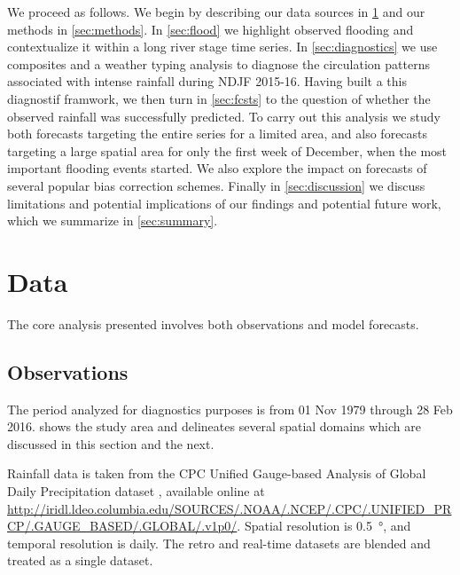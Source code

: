 \documentclass[twocol]{ametsoc}
\begin{document}
We proceed as follows.
We begin by describing our data sources in \cref{sec:data} and our methods in \cref{sec:methods}.
In \cref{sec:flood} we highlight observed flooding and contextualize it within a long river stage time series.
In \cref{sec:diagnostics} we use composites and a weather typing analysis to diagnose the circulation patterns associated with intense rainfall during NDJF 2015-16.
Having built a this diagnostif framwork, we then turn in \cref{sec:fcsts} to the question of whether the observed rainfall was successfully predicted.
To carry out this analysis we study both forecasts targeting the entire series for a limited area, and also forecasts targeting a large spatial area for only the first week of December, when the most important flooding events started.
We also explore the impact on forecasts of several popular bias correction schemes.
Finally in \cref{sec:discussion} we discuss limitations and potential implications of our findings and potential future work, which we summarize in \cref{sec:summary}.


\section{Data} \label{sec:data}

The core analysis presented involves both observations and model forecasts.

\subsection{Observations}

The period analyzed for diagnostics purposes is from 01 Nov 1979 through 28 Feb 2016.
 shows the study area and delineates several spatial domains which are discussed in this section and the next.

Rainfall data is taken from the CPC Unified Gauge-based Analysis of Global Daily Precipitation dataset \citep{xie2010cpc}, available online at \url{http://iridl.ldeo.columbia.edu/SOURCES/.NOAA/.NCEP/.CPC/.UNIFIED_PRCP/.GAUGE_BASED/.GLOBAL/.v1p0/}.
Spatial resolution is \SI{0.5}{\degree}, and temporal resolution is daily.
The retro and real-time datasets are blended and treated as a single dataset.
\end{document}
